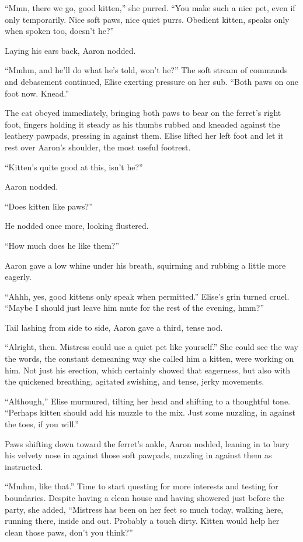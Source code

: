 \documentclass[12pt,letterpaper,oneside]{memoir}
\begin{document}
  ``Mmn, there we go, good kitten,'' she purred. ``You make such a nice pet, even if only temporarily. Nice soft paws, nice quiet purrs. Obedient kitten, speaks only when spoken too, doesn't he?''

  Laying his ears back, Aaron nodded.

  ``Mmhm, and he'll do what he's told, won't he?'' The soft stream of commands and debasement continued, Elise exerting pressure on her sub. ``Both paws on one foot now. Knead.''

  The cat obeyed immediately, bringing both paws to bear on the ferret's right foot, fingers holding it steady as his thumbs rubbed and kneaded against the leathery pawpads, pressing in against them. Elise lifted her left foot and let it rest over Aaron's shoulder, the most useful footrest.

  ``Kitten's quite good at this, isn't he?''

  Aaron nodded.

  ``Does kitten like paws?''

  He nodded once more, looking flustered.

  ``How much does he like them?''

  Aaron gave a low whine under his breath, squirming and rubbing a little more eagerly.

  ``Ahhh, yes, good kittens only speak when permitted.'' Elise's grin turned cruel. ``Maybe I should just leave him mute for the rest of the evening, hmm?''

  Tail lashing from side to side, Aaron gave a third, tense nod.

  ``Alright, then. Mistress could use a quiet pet like yourself.'' She could see the way the words, the constant demeaning way she called him a kitten, were working on him. Not just his erection, which certainly showed that eagerness, but also with the quickened breathing, agitated swishing, and tense, jerky movements.

  ``Although,'' Elise murmured, tilting her head and shifting to a thoughtful tone. ``Perhaps kitten should add his muzzle to the mix. Just some nuzzling, in against the toes, if you will.''

  Paws shifting down toward the ferret's ankle, Aaron nodded, leaning in to bury his velvety nose in against those soft pawpads, nuzzling in against them as instructed.

  ``Mmhm, like that.'' Time to start questing for more interests and testing for boundaries.  Despite having a clean house and having showered just before the party, she added, ``Mistress has been on her feet so much today, walking here, running there, inside and out. Probably a touch dirty. Kitten would help her clean those paws, don't you think?''
\end{document}

